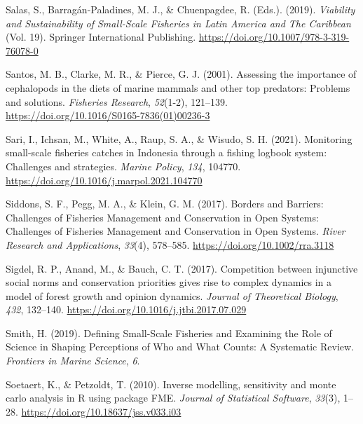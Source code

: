 \documentclass[
]{article}
\newlength{\cslhangindent}
\newlength{\cslentryspacingunit} %
\newenvironment{CSLReferences}[2] %
 {%
  \setlength{\parindent}{0pt}
  \ifodd #1
  \let\oldpar\par
  \def\par{\hangindent=\cslhangindent\oldpar}
  \fi
  \setlength{\parskip}{#2\cslentryspacingunit}
 }%
 {}
\begin{document}
\begin{CSLReferences}{1}{0}
\leavevmode{}%
Salas, S., Barragán-Paladines, M. J., \& Chuenpagdee, R. (Eds.). (2019). \emph{Viability and {Sustainability} of {Small}-{Scale} {Fisheries} in {Latin} {America} and {The} {Caribbean}} (Vol. 19). Springer International Publishing. \url{https://doi.org/10.1007/978-3-319-76078-0}

\leavevmode{}%
Santos, M. B., Clarke, M. R., \& Pierce, G. J. (2001). Assessing the importance of cephalopods in the diets of marine mammals and other top predators: Problems and solutions. \emph{Fisheries Research}, \emph{52}(1-2), 121--139. \url{https://doi.org/10.1016/S0165-7836(01)00236-3}

\leavevmode{}%
Sari, I., Ichsan, M., White, A., Raup, S. A., \& Wisudo, S. H. (2021). Monitoring small-scale fisheries catches in {Indonesia} through a fishing logbook system: {Challenges} and strategies. \emph{Marine Policy}, \emph{134}, 104770. \url{https://doi.org/10.1016/j.marpol.2021.104770}

\leavevmode{}%
Siddons, S. F., Pegg, M. A., \& Klein, G. M. (2017). Borders and {Barriers}: Challenges of {Fisheries} {Management} and {Conservation} in {Open} {Systems}: {Challenges} of {Fisheries} {Management} and {Conservation} in {Open} {Systems}. \emph{River Research and Applications}, \emph{33}(4), 578--585. \url{https://doi.org/10.1002/rra.3118}

\leavevmode{}%
Sigdel, R. P., Anand, M., \& Bauch, C. T. (2017). Competition between injunctive social norms and conservation priorities gives rise to complex dynamics in a model of forest growth and opinion dynamics. \emph{Journal of Theoretical Biology}, \emph{432}, 132--140. \url{https://doi.org/10.1016/j.jtbi.2017.07.029}

\leavevmode{}%
Smith, H. (2019). Defining {Small}-{Scale} {Fisheries} and {Examining} the {Role} of {Science} in {Shaping} {Perceptions} of {Who} and {What} {Counts}: {A} {Systematic} {Review}. \emph{Frontiers in Marine Science}, \emph{6}.

\leavevmode{}%
Soetaert, K., \& Petzoldt, T. (2010). Inverse modelling, sensitivity and monte carlo analysis in {R} using package {FME}. \emph{Journal of Statistical Software}, \emph{33}(3), 1--28. \url{https://doi.org/10.18637/jss.v033.i03}


\end{CSLReferences}
\end{document}
